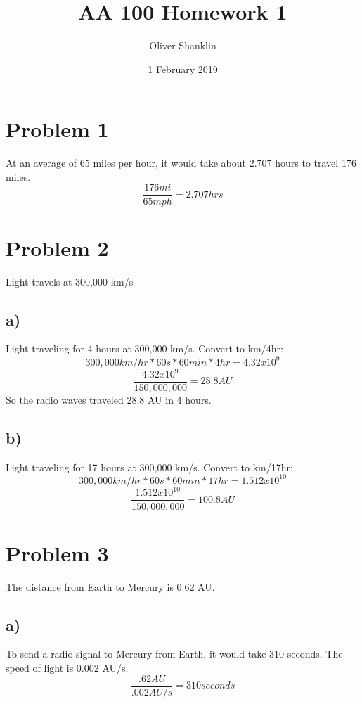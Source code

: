 \documentclass{article}
\title{AA 100 Homework 1}
\author{Oliver Shanklin}
\date{1 February 2019}
\begin{document}
\maketitle

\section*{Problem 1}
At an average of 65 miles per hour, it would take about 2.707 hours to travel 176 miles.
\begin{equation}
    \frac{176 mi}{65 mph} = 2.707 hrs
\end{equation}

\section*{Problem 2}
Light travels at 300,000 km/s
\subsection*{a)}
Light traveling for 4 hours at 300,000 km/s. Convert to km/4hr:
\begin{equation}
    300,000km/hr * 60s * 60min * 4hr = 4.32x10^9
\end{equation}
\begin{equation}
    \frac{4.32x10^9}{150,000,000} = 28.8 AU
\end{equation}
So the radio waves traveled 28.8 AU in 4 hours.
\subsection*{b)}
Light traveling for 17 hours at 300,000 km/s. Convert to km/17hr:
\begin{equation}
    300,000km/hr * 60s * 60min * 17hr = 1.512x10^10
\end{equation}
\begin{equation}
    \frac{1.512x10^10}{150,000,000} = 100.8 AU
\end{equation}

\section*{Problem 3}
The distance from Earth to Mercury is 0.62 AU.
\subsection*{a)}
To send a radio signal to Mercury from Earth, it would take 310 seconds. The speed of light is 0.002 AU/s.
\begin{equation}
    \frac{.62 AU}{.002 AU/s} = 310 seconds
\end{equation}
\end{document}
